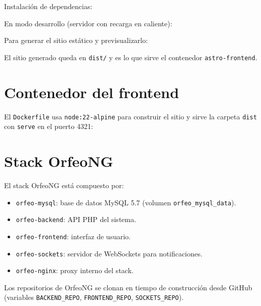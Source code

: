 \documentclass[12pt,a4paper]{report}
\begin{document}
Instalación de dependencias:


En modo desarrollo (servidor con recarga en caliente):


Para generar el sitio estático y previsualizarlo:


El sitio generado queda en \texttt{dist/} y es lo que sirve el contenedor
\texttt{astro-frontend}.

\section{Contenedor del frontend}

El \texttt{Dockerfile} usa \texttt{node:22-alpine} para construir el sitio y
sirve la carpeta \texttt{dist} con \texttt{serve} en el puerto 4321:


\section{Stack OrfeoNG}

El stack OrfeoNG está compuesto por:

\begin{itemize}
  \item \texttt{orfeo-mysql}: base de datos MySQL 5.7 (volumen
        \texttt{orfeo\_mysql\_data}).
  \item \texttt{orfeo-backend}: API PHP del sistema.
  \item \texttt{orfeo-frontend}: interfaz de usuario.
  \item \texttt{orfeo-sockets}: servidor de WebSockets para notificaciones.
  \item \texttt{orfeo-nginx}: proxy interno del stack.
\end{itemize}

Los repositorios de OrfeoNG se clonan en tiempo de construcción desde GitHub
(variables \texttt{BACKEND\_REPO}, \texttt{FRONTEND\_REPO},
\texttt{SOCKETS\_REPO}).
\end{document}
